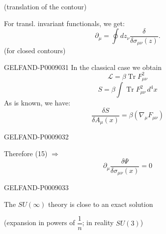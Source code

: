 (translation of the contour)

For transl. invariant functionals, we get:
\begin{equation*}
\partial_\mu=\oint dz_\nu\frac{\delta}{\delta\sigma_{\mu\nu}(z)}.
\tag{20}
\end{equation*}
(for closed contours)


\begin{GelfandAdjacentEvidence}{GELFAND-P000903}{1}
In the classical case we obtain
\begin{equation*}
\mathcal L=\beta\operatorname{Tr}F_{\mu\nu}^2
\tag{21}
\end{equation*}
\begin{equation*}
S=\beta\int\operatorname{Tr}F_{\mu\nu}^2\,d^4x
\tag{22}
\end{equation*}
As is known, we have:
\begin{equation*}
\frac{\delta S}{\delta A_\mu(x)}=\beta(\nabla_\mu F_{\mu\nu})
\tag{23}
\end{equation*}
\end{GelfandAdjacentEvidence}
\begin{GelfandAdjacentEvidence}{GELFAND-P000903}{2}


Therefore (15) $\Rightarrow$
\begin{equation*}
\partial_\mu\frac{\delta\Psi}{\delta\sigma_{\mu\nu}(x)}=0
\tag{24}
\end{equation*}

\end{GelfandAdjacentEvidence}
\begin{GelfandAdjacentEvidence}{GELFAND-P000903}{3}


The $SU(\infty)$ theory is close to an exact solution

(expansion in powers of $\dfrac{1}{n}$; in reality $SU(3)$)
\end{GelfandAdjacentEvidence}
